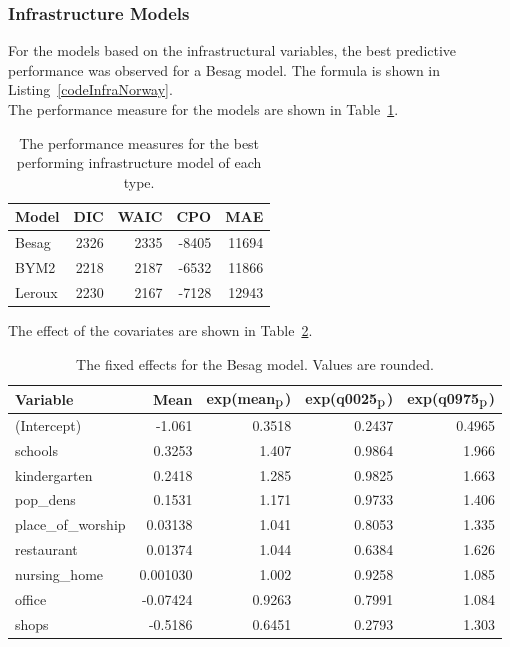 \subsubsection{Infrastructure Models}
For the models based on the infrastructural variables, the best predictive performance was observed for a Besag model. The formula is shown in Listing~\ref{codeInfraNorway}. \\
The performance measure for the models are shown in Table~\ref{infraNorway}.
\begin{table}[H] 
\caption{The performance measures for the best performing infrastructure model of each type. \label{infraNorway}}
\begin{tabular}{l r r r r}
\toprule
\textbf{Model}	& \textbf{DIC}	& \textbf{WAIC} & \textbf{CPO} & \textbf{MAE} \\
\midrule
Besag  & 2326 & 2335 & -8405 & 11694 \\
BYM2 & 2218 & 2187 & -6532 & 11866\\
Leroux &  2230 & 2167 & -7128 & 12943\\
\bottomrule
\end{tabular}
\end{table}
The effect of the covariates are shown in Table~\ref{fixedInfraNorway}.
\begin{table}[H] 
\caption{The fixed effects for the Besag model. Values are rounded. \label{fixedInfraNorway}}
\begin{tabular}{l r r r r}
\toprule
\textbf{Variable}	& \textbf{Mean}	& \textbf{exp(mean$_{\hbox{p}}$)} & \textbf{exp(q0025$_{\hbox{p}}$)} & \textbf{exp(q0975$_{\hbox{p}}$)} \\
\midrule
(Intercept) & -1.061 & 0.3518 & 0.2437 & 0.4965 \\
schools & 0.3253 & 1.407 & 0.9864 & 1.966 \\
kindergarten & 0.2418 & 1.285 & 0.9825 & 1.663 \\
pop\_dens & 0.1531 & 1.171 &  0.9733  & 1.406\\
place\_of\_worship & 0.03138 & 1.041 & 0.8053 & 1.335 \\
restaurant & 0.01374 & 1.044 & 0.6384 & 1.626 \\
nursing\_home & 0.001030 & 1.002 & 0.9258 & 1.085\\
office & -0.07424 & 0.9263 &  0.7991 & 1.084 \\
shops & -0.5186 &0.6451 & 0.2793 & 1.303 \\
\bottomrule
\end{tabular}
\end{table}
